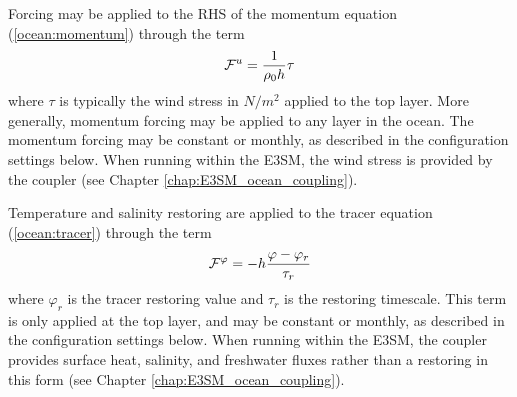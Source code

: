 Forcing may be applied to the RHS of the momentum equation (\ref{ocean:momentum}) through the term 
\begin{equation}
{\cal F}^u = \frac{1}{\rho_0 h}\tau \label{ocean:\mode_mom_surf_forcing}
\end{equation}
where $\tau$ is typically the wind stress in $N/m^2$ applied to the top layer.  More generally, momentum forcing may be applied to any layer in the ocean.  The momentum forcing may be constant or monthly, as described in the configuration settings below.  When running within the E3SM, the wind stress is provided by the coupler (see Chapter \ref{chap:E3SM_ocean_coupling}).

Temperature and salinity restoring are applied to the tracer equation (\ref{ocean:tracer}) through the term
\begin{equation}
{\cal F}^\varphi = -h\frac{\varphi-\varphi_{r}}{\tau_{r}}
\end{equation}
where $\varphi_{r}$ is the tracer restoring value and $\tau_{r}$ is the restoring timescale.  This term is only applied at the top layer, and may be constant or monthly, as described in the configuration settings below.  When running within the E3SM, the coupler provides surface heat, salinity, and freshwater fluxes rather than a restoring in this form (see Chapter \ref{chap:E3SM_ocean_coupling}).
